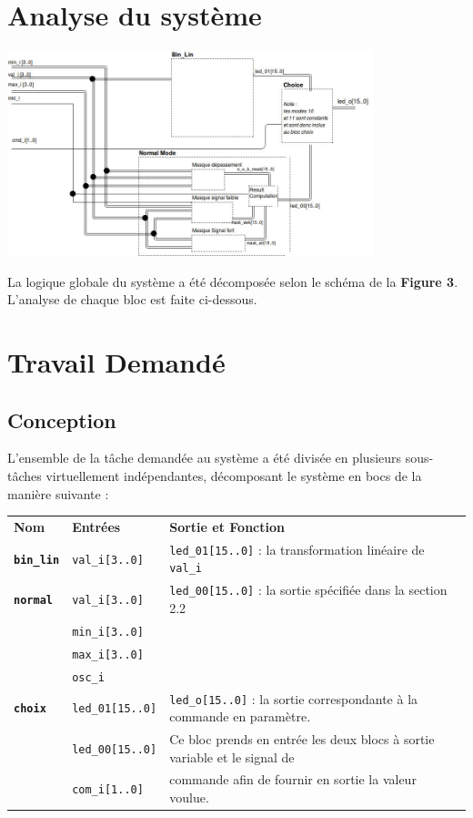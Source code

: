 \section{Analyse du système}

\begin{minipage}{\textwidth}
	\center
	\includegraphics[width = 0.8\textwidth]{figures/schema_bloc.jpg}
\end{minipage}

La logique globale du système a été décomposée selon le schéma de la \textbf{Figure 3}. L'analyse de chaque bloc est faite ci-dessous.
\newpage
\section{Travail Demandé}

\subsection{Conception}

L'ensemble de la tâche demandée au système a été divisée en plusieurs sous-tâches virtuellement indépendantes, décomposant le système en bocs de la manière suivante : 
\begin{center}

\begin{tabular}{lll}
\textbf{Nom }& \textbf{Entrées} & \textbf{Sortie et Fonction} \\
\textbf{\texttt{bin\_lin}} & \texttt{val\_i[3..0]}& \texttt{led\_01[15..0]} : la transformation linéaire de \texttt{val\_i} \\
\hline
\textbf{\texttt{normal}} & \texttt{val\_i[3..0] }& \texttt{led\_00[15..0]} : la sortie spécifiée dans la section 2.2\\ 
& \texttt{min\_i[3..0]} & \\ 
& \texttt{max\_i[3..0]} & \\
& \texttt{osc\_i} & \\
\hline
\textbf{\texttt{choix}} & \texttt{led\_01[15..0]} &  \texttt{led\_o[15..0]} : la sortie correspondante à la commande en paramètre. \\
& \texttt{led\_00[15..0]} & Ce bloc prends en entrée les deux blocs à sortie variable et le signal de\\
& \texttt{com\_i[1..0]} &  commande afin de fournir en sortie la valeur voulue. \\
\end{tabular}
\end{center}



